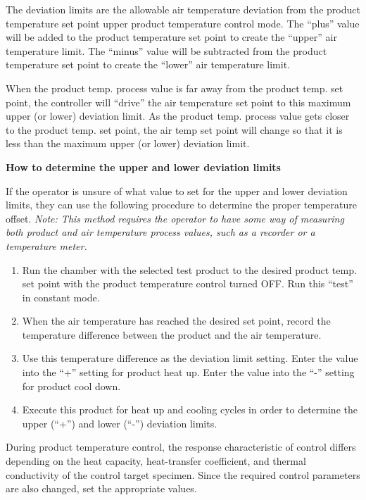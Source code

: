 The deviation limits are the allowable air temperature deviation from
the product temperature set point upper product temperature control
mode. The ``plus'' value will be added to the product temperature set
point to create the ``upper'' air temperature limit. The ``minus'' value
will be subtracted from the product temperature set point to create the
``lower'' air temperature limit.

When the product temp. process value is far away from the product temp.
set point, the controller will ``drive'' the air temperature set point
to this maximum upper (or lower) deviation limit. As the product temp.
process value gets closer to the product temp. set point, the air temp
set point will change so that it is less than the maximum upper (or
lower) deviation limit.

\textbf{How to determine the upper and lower deviation limits}

If the operator is unsure of what value to set for the upper and lower
deviation limits, they can use the following procedure to determine the
proper temperature offset. \emph{Note: This method requires the operator
to have some way of measuring both product and air temperature process
values, such as a recorder or a temperature meter.}

\begin{enumerate}
\def\labelenumi{\arabic{enumi}.}
\item
  Run the chamber with the selected test product to the desired product
  temp. set point with the product temperature control turned OFF. Run
  this ``test'' in constant mode.
\item
  When the air temperature has reached the desired set point, record the
  temperature difference between the product and the air temperature.
\item
  Use this temperature difference as the deviation limit setting. Enter
  the value into the ``+'' setting for product heat up. Enter the value
  into the ``-'' setting for product cool down.
\item
  Execute this product for heat up and cooling cycles in order to
  determine the upper (``+'') and lower (``-'') deviation limits.
\end{enumerate}

During product temperature control, the response characteristic of
control differs depending on the heat capacity, heat-transfer
coefficient, and thermal conductivity of the control target specimen.
Since the required control parameters are also changed, set the
appropriate values.

